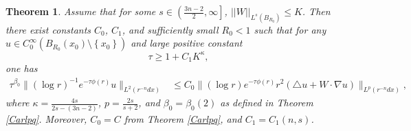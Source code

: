 \documentclass[11pt]{amsart}
\theoremstyle{plain}
\newtheorem{theorem}{Theorem}
\numberwithin{equation}{section}
\begin{document}
\begin{theorem}
Assume that for some $s \in {\left( {\frac{3n-2}{2}, {\infty}} \right] }$, ${\left\vert\left\vert {W}\right\vert\right\vert}_{L^s{\left( {B_{R_0}} \right) }} \le K$.
Then there exist constants $C_0$, $C_1$, and sufficiently small $R_0 < 1$  such that for any $u\in C^{\infty}_{0}(B_{R_0}(x_0)\setminus {\left\{{x_0}\right\}})$ and large positive constant
$$\tau \ge 1+ C_1 K^{\kappa},$$
one has
\begin{align}
\tau^{{\beta}_0} \|(\log r)^{-1} e^{-\tau \phi(r)}u\|_{L^2(r^{-n}dx)}
&\leq  C_0 \|(\log r ) e^{-\tau \phi(r)} r^2{\left( { \triangle u + W \cdot {\nabla} u} \right) }\|_{L^p(r^{-n} dx)} ,
\label{main1}
\end{align}
where $\kappa = \frac{4s}{2s - {\left( {3n-2} \right) }}$, $p = \frac{2s}{s+2}$, and ${\beta}_0 = {\beta}_0{\left( {2} \right) }$ as defined in Theorem \ref{Carlpq}.
Moreover, $C_0 = C$ from Theorem \ref{Carlpq}, and $C_1 = C_1{\left( {n, s} \right) }$.
\label{CarlpqW}
\end{theorem}
\end{document}
